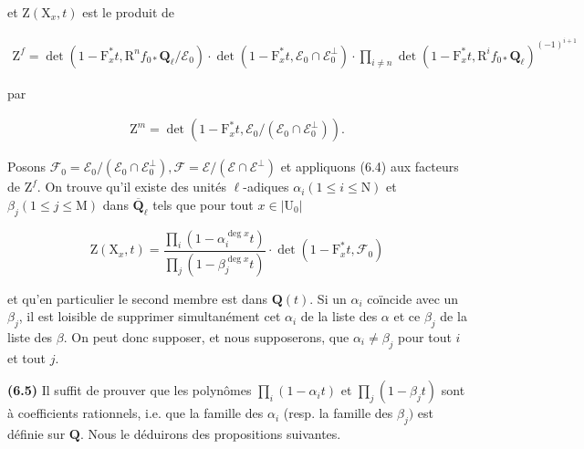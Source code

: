 \documentclass[10pt,leqno]{article}
\begin{document}
\noindent et \(\mathrm{Z}(\mathrm{X}_{x},t)\) est le produit de\par

\begin{equation*}\begin{gathered}\mathrm{Z}^{f}=\operatorname{det}(1- \mathrm{F}_{x}^{*}t,\mathrm{R}^{n} f_{0*}\mathbf{Q}_{\ell }/\mathcal{E} _{0})\cdot \operatorname{det}(1- \mathrm{F}_{x}^{*}t,\mathcal{E} _{0}\cap \mathcal{E} _{0}^{\perp })\cdot \prod _{i\ne n}\operatorname{det}(1- \mathrm{F}_{x}^{*}t,\mathrm{R}^{i} f_{0*}\mathbf{Q}_{\ell })^{(- 1)^{i+1}}\end{gathered}\end{equation*}

\noindent par\par

\begin{equation*}\begin{gathered}\mathrm{Z}^{m}=\operatorname{det}(1- \mathrm{F}_{x}^{*}t,\mathcal{E} _{0}/(\mathcal{E} _{0}\cap \mathcal{E} _{0}^{\perp })).\end{gathered}\end{equation*}

\noindent Posons \(\mathcal{F} _{0}=\mathcal{E} _{0}/(\mathcal{E} _{0}\cap \mathcal{E} _{0}^{\perp }), \mathcal{F} =\mathcal{E} /(\mathcal{E} \cap \mathcal{E} ^{\perp })\) et appliquons (6.4) aux facteurs de \(\mathrm{Z}^{f}\). On trouve qu’il existe des unités \(\ell \)-adiques \(\alpha _{i} (1\leq i\leq \mathrm{N})\) et \(\beta _{j} (1\leq j\leq \mathrm{M})\) dans \(\overline{\mathbf{Q}}_{\ell }\) tels que pour tout \(x\in |\mathrm{U}_{0}|\)\par

\[\mathrm{Z}(\mathrm{X}_{x},t)=\frac{\prod\limits _{i}(1- \alpha _{i}^{\operatorname{deg} x}t)}{\prod\limits _{j}(1- \beta _{j}^{\operatorname{deg} x}t)}\cdot \operatorname{det}(1- \mathrm{F}_{x}^{*}t,\mathcal{F} _{0})\]

\noindent et qu’en particulier le second membre est dans \(\mathbf{Q}(t)\). Si un \(\alpha _{i}\) coïncide avec un \(\beta _{j}\), il est loisible de supprimer simultanément cet \(\alpha _{i}\) de la liste des \(\alpha \) et ce \(\beta _{j}\) de la liste des \(\beta \). On peut donc supposer, et nous supposerons, que \(\alpha _{i}\ne \beta _{j}\) pour tout \(i\) et tout \(j\).\par

\noindent \textbf{(6.5)} Il suffit de prouver que les polynômes \(\prod _{i}(1- \alpha _{i} t)\) et \(\prod _{j}(1- \beta _{j} t)\) sont à coefficients rationnels, i.e. que la famille des \(\alpha _{i}\) (resp. la famille des \(\beta _{j})\) est définie sur \(\mathbf{Q}\). Nous le déduirons des propositions suivantes.\par
\end{document}
